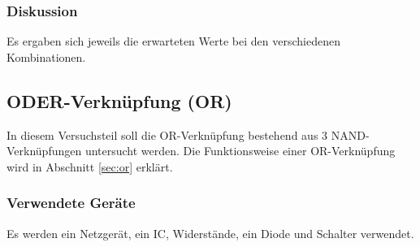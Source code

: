 \documentclass[12pt,a4paper]{article}
\begin{document}
\subsubsection*{Diskussion}

Es ergaben sich jeweils die erwarteten Werte bei den verschiedenen Kombinationen.

\subsection{ODER-Verknüpfung (OR)}

In diesem Versuchsteil soll die OR-Verknüpfung bestehend aus 3 NAND-Verknüpfungen untersucht werden. Die Funktionsweise einer OR-Verknüpfung wird in Abschnitt \ref{sec:or} erklärt.

\subsubsection*{Verwendete Geräte}

Es werden ein Netzgerät, ein IC, Widerstände, ein Diode und Schalter verwendet.
\end{document}
